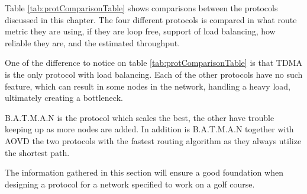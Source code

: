 Table \ref{tab:protComparisonTable} shows comparisons between the protocols discussed in this chapter. The four different protocols is compared in what route metric they are using, if they are loop free, support of load balancing, how reliable they are, and the estimated throughput.

One of the difference to notice on table \ref{tab:protComparisonTable} is that TDMA is the only protocol with load balancing. Each of the other protocols have no such feature, which can result in some nodes in the network, handling a heavy load, ultimately creating a bottleneck.

B.A.T.M.A.N is the protocol which scales the best, the other have trouble keeping up as more nodes are added. In addition is B.A.T.M.A.N together with AOVD the two protocols with the fastest routing algorithm as they always utilize the shortest path.

The information gathered in this section will ensure a good foundation when designing a protocol for a network specified to work on a golf course.